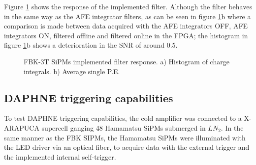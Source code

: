 Figure \ref{fig:fbk_filtered} shows the response of the implemented filter. Although the filter behaves in the same way as the AFE integrator filters, as can be seen in figure \ref{fig:fbk_filtered}b where a comparison is made between data acquired with the AFE integrators OFF, AFE integrators ON, filtered offline and filtered online in the FPGA; the histogram in figure \ref{fig:fbk_filtered}b shows a deterioration in the SNR of around 0.5.

\begin{figure}[h]
\centering
{}
\caption[]{FBK-3T SiPMs implemented filter response.  a) Histogram of charge integrals. b) Average single P.E.}
\label{fig:fbk_filtered}
\end{figure}

\subsection{DAPHNE triggering capabilities}

To test DAPHNE triggering capabilities, the cold amplifier was connected to a X-ARAPUCA supercell ganging 48 Hamamatsu SiPMs submerged in $LN_2$. In the same manner as the FBK SIPMs, the Hamamatsu SiPMs were illuminated with the LED driver via an optical fiber, to acquire data with the external trigger and the implemented internal self-trigger. 

